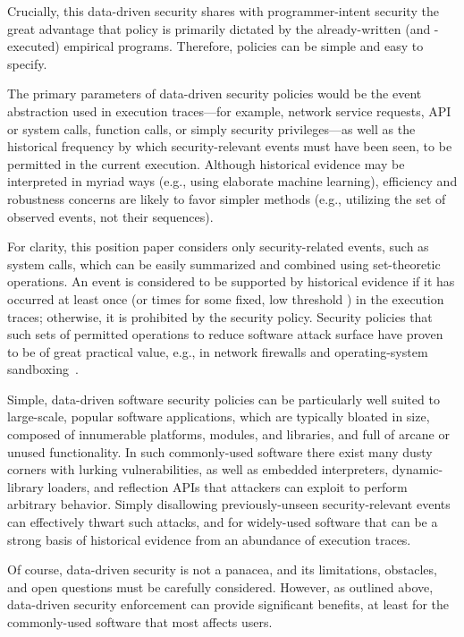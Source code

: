 \documentclass{IEEEtran}
\begin{document}
Crucially, this data-driven security shares with programmer-intent security
the great advantage 
that policy is primarily dictated by the already-written (and -executed) empirical programs.
Therefore,
policies can be simple and easy to specify.


The primary parameters of data-driven security policies would be the event
abstraction used in execution traces---for example,
network service requests, API or system calls, function calls, or simply security privileges---as
well as
the historical frequency by which 
security-relevant events must have been seen,
to be permitted in the current execution.
Although historical evidence may be interpreted in myriad ways
(e.g., using elaborate machine learning),
efficiency and robustness concerns are likely to favor simpler methods
(e.g., utilizing the set of observed events, not their sequences).


For clarity,
this position paper considers
only security-related events, such as system calls,
which can be easily summarized and combined using set-theoretic operations.
An event is considered to be supported by 
historical evidence
if it has occurred at least once (or  times for some fixed, low threshold )
in the execution traces;
otherwise, it is prohibited by the security policy.
Security policies
that such sets of permitted operations to reduce software attack surface 
have proven to be of great practical value,
e.g., in network firewalls and operating-system sandboxing~\cite{ChromeSandbox}.


Simple, data-driven software security policies
can be particularly well suited
to large-scale, popular software applications,
which are typically
bloated in size,
composed of innumerable platforms, modules, and libraries,
and full of arcane or unused functionality.
In such commonly-used software
there exist many dusty corners with lurking vulnerabilities,
as well as embedded interpreters, dynamic-library loaders, and reflection APIs
that attackers can exploit to perform arbitrary behavior.
Simply disallowing previously-unseen security-relevant events
can effectively thwart such attacks,
and for widely-used software
that can be a strong basis of historical evidence 
from an abundance of execution traces.




Of course, data-driven security is not a panacea, 
and its limitations, obstacles, and open questions must be carefully considered.
However, 
as outlined above,
data-driven security enforcement can provide significant benefits,
at least for the commonly-used software that most affects users.
\end{document}
